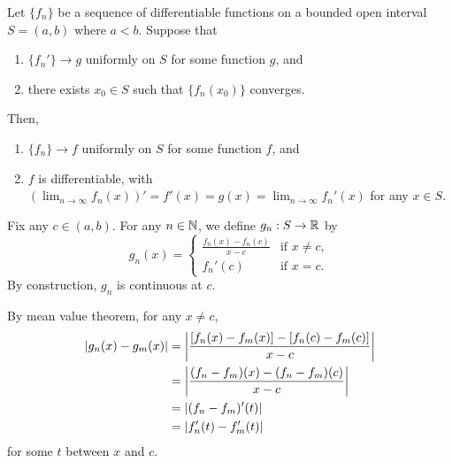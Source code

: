 \begin{enumerate}
\begin{proposition}
\label{prp:unif-conv-lim-diff-comm}
Let \(\{f_n\}\) be a sequence of differentiable functions on a bounded open
interval \(S=(a,b)\) where \(a<b\). Suppose that
\begin{enumerate}[label={(\roman*)}]
\item \(\{f_n'\}\to g\) uniformly on \(S\) for some function \(g\), and
\item there exists \(x_0\in S\) such that \(\{f_n(x_0)\}\) converges.
\end{enumerate}
Then,
\begin{enumerate}
\item \(\{f_n\}\to f\) uniformly on \(S\) for some function \(f\), and
\item \(f\) is differentiable, with \((\lim_{n\to \infty}f_n(x))'=f'(x)=g(x)=\lim_{n\to \infty}f_n'(x)\) for any \(x\in S\).
\end{enumerate}
\end{proposition}
\begin{pf}
Fix any \(c\in (a,b)\). For any \(n\in\mathbb{N}\), we define \(g_n:S\to\mathbb{R}\) by
\[
g_n(x)=\begin{cases}
\frac{f_n(x)-f_n(c)}{x-c}&\text{if \(x\ne c\)}, \\
f_n'(c)&\text{if \(x=c\)}.
\end{cases}
\]
By construction, \(g_n\) is continuous at \(c\).

By mean value theorem, for any \(x\ne c\),
\begin{align*}
|g_n(x)-g_m(x)|&=\qty|\frac{[f_n(x)-f_m(x)]-[f_n(c)-f_m(c)]}{x-c}| \\
&=\qty|\frac{(f_n-f_m)(x)-(f_n-f_m)(c)}{x-c}| \\
&=|(f_n-f_m)'(t)| \\
&=|f_n'(t)-f_m'(t)|
\end{align*}
for some \(t\) between \(x\) and \(c\).


\end{pf}
\end{enumerate}
